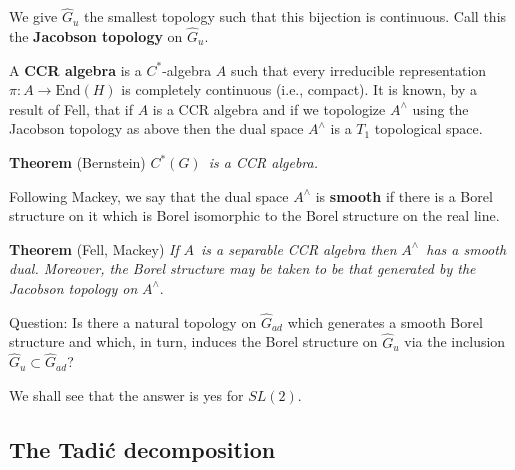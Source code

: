 \documentclass[11pt, a4paper]{article}
\begin{document}
We give $\hat G_u$ the smallest topology such that this bijection is
continuous. Call this the {\bf Jacobson topology} on $\hat G_u$.

A {\bf CCR algebra} is a $C^{*}$-algebra $A$ such that every irreducible
representation $\pi :A\rightarrow \mathrm{End}(H)$ is completely continuous (i.e.,
compact). It is known, by a result of Fell, that if $A$ is a CCR algebra and
if we topologize $A^{\wedge }$ using the Jacobson topology as above then the
dual space $A^{\wedge }$ is a $T_1$ topological space.

{\bf Theorem} (Bernstein) $C^{*}(G)${\em \ is a CCR algebra.}

Following Mackey, we say that the dual space $A^{\wedge }$ is {\bf smooth}
if there is a Borel structure on it which is Borel isomorphic to the Borel
structure on the real line.

{\bf Theorem} (Fell, Mackey) {\em If }$A${\em \ is a separable CCR algebra
then }$A^{\wedge }${\em \ has a smooth dual. Moreover, the Borel structure
may be taken to be that generated by the Jacobson topology on }$A^{\wedge }$.

{\sc Question}: Is there a natural topology on $\hat G_{ad}$ which generates
a smooth Borel structure and which, in turn, induces the Borel structure on $%
\hat G_u$ via the inclusion $\hat G_u\subset \hat G_{ad}$?

We shall see that the answer is yes for $SL(2)$.

\subsection{The Tadi\'c decomposition}
\end{document}
